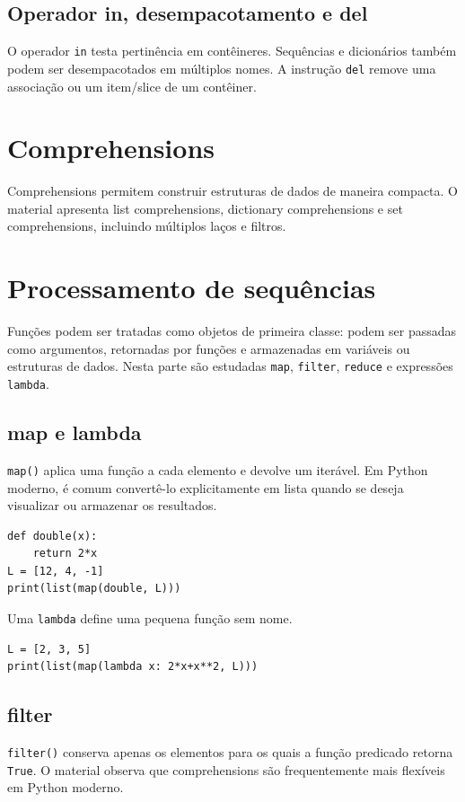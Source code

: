 \documentclass[11pt,a4paper]{article}
\begin{document}
\subsection{Operador in, desempacotamento e del}
O operador \texttt{in} testa pertinência em contêineres. Sequências e dicionários também podem ser desempacotados em múltiplos nomes. A instrução \texttt{del} remove uma associação ou um item/slice de um contêiner.

\section{Comprehensions}
Comprehensions permitem construir estruturas de dados de maneira compacta. O material apresenta list comprehensions, dictionary comprehensions e set comprehensions, incluindo múltiplos laços e filtros.

\section{Processamento de sequências}
Funções podem ser tratadas como objetos de primeira classe: podem ser passadas como argumentos, retornadas por funções e armazenadas em variáveis ou estruturas de dados. Nesta parte são estudadas \texttt{map}, \texttt{filter}, \texttt{reduce} e expressões \texttt{lambda}.

\subsection{map e lambda}
\texttt{map()} aplica uma função a cada elemento e devolve um iterável. Em Python moderno, é comum convertê-lo explicitamente em lista quando se deseja visualizar ou armazenar os resultados.

\begin{lstlisting}
def double(x):
    return 2*x
L = [12, 4, -1]
print(list(map(double, L)))
\end{lstlisting}

Uma \texttt{lambda} define uma pequena função sem nome.
\begin{lstlisting}
L = [2, 3, 5]
print(list(map(lambda x: 2*x+x**2, L)))
\end{lstlisting}

\subsection{filter}
\texttt{filter()} conserva apenas os elementos para os quais a função predicado retorna \texttt{True}. O material observa que comprehensions são frequentemente mais flexíveis em Python moderno.
\end{document}

